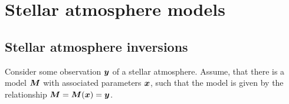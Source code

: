 \documentclass[a4paper,12pt]{report}
\begin{document}

\section{Stellar atmosphere models}
\subsection{Stellar atmosphere inversions}
Consider some observation $\bm{y}$ of a stellar atmosphere. Assume, that there is a model $\bm{M}$ with associated parameters $\bm{x}$, such that the model is given by the relationship $\bm{M} = \bm{M}(\bm{x}) = \bm{y}$.
\end{document}
